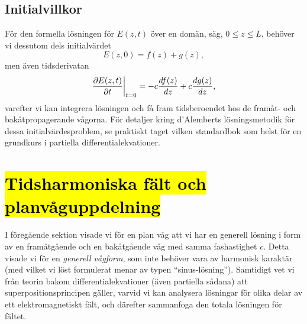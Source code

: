 \subsection{Initialvillkor}
F{\"o}r den formella l{\"o}sningen f{\"o}r $E(z,t)$ {\"o}ver en dom{\"a}n,
s{\"a}g, $0\le z\le L$, beh{\"o}ver vi dessutom dels initialv{\"a}rdet
$$
  E(z,0) = f(z) + g(z),
$$
men {\"a}ven tidsderivatan
$$
  {{\partial E(z,t)}\over{\partial t}}\bigg|_{t=0}
    = -c{{df(z)}\over{dz}} + c{{dg(z)}\over{dz}},
$$
varefter vi kan integrera l{\"o}sningen och f{\aa} fram tidsberoendet hos de
fram{\aa}t- och bak{\aa}tpropagerande v{\aa}gorna. F{\"o}r detaljer kring
d'Alemberts l{\"o}sningsmetodik f{\"o}r dessa initialv{\"a}rdesproblem, se
praktiskt taget vilken standardbok som helst f{\"o}r en grundkurs i partiella
differentialekvationer.

\section{{\hl{Tidsharmoniska f{\"a}lt och planv{\aa}guppdelning}}}
I f{\"o}reg{\aa}ende sektion visade vi f{\"o}r en plan v{\aa}g att vi har en
generell l{\"o}sning i form av en fram{\aa}tg{\aa}ende och en
bak{\aa}tg{\aa}ende v{\aa}g med samma fashastighet $c$. Detta visade vi f{\"o}r
en {\it generell v{\aa}gform}, som inte beh{\"o}ver vara av harmonisk
karakt{\"a}r (med vilket vi l{\"o}st formulerat menar av typen
``sinus-l{\"o}sning''). Samtidigt vet vi fr{\aa}n teorin bakom
differentialekvationer ({\"a}ven partiella s{\aa}dana) att
superpositionsprincipen g{\"a}ller, varvid vi kan analysera l{\"o}sningar
f{\"o}r olika delar av ett elektromagnetiskt f{\"a}lt, och d{\"a}refter
sammanfoga den totala l{\"o}sningen f{\"o}r f{\"a}ltet.

